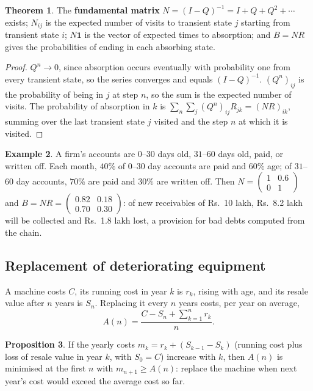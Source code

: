 \documentclass[11pt,a4paper]{article}
\numberwithin{equation}{section}
\theoremstyle{definition}
\newtheorem{thm}{Theorem}[subsection]
\newtheorem{exa}[thm]{Example}
\newtheorem{prop}[thm]{Proposition}
\begin{document}
\begin{thm}
\label{thm:absorbing}
The \textbf{fundamental matrix} $N = (I - Q)^{-1} = I + Q + Q^2 + \cdots$ exists; $N_{ij}$ is the expected number of visits to transient state $j$ starting from transient state $i$; $N\mathbf 1$ is the vector of expected times to absorption; and $B = NR$ gives the probabilities of ending in each absorbing state.
\end{thm}

\begin{proof}
$Q^n \to 0$, since absorption occurs eventually with probability one from every transient state, so the series converges and equals $(I - Q)^{-1}$. $(Q^n)_{ij}$ is the probability of being in $j$ at step $n$, so the sum is the expected number of visits. The probability of absorption in $k$ is $\sum_n\sum_j(Q^n)_{ij}R_{jk} = (NR)_{ik}$, summing
over the last transient state $j$ visited and the step $n$ at which it is visited.
\end{proof}

\begin{exa}
\label{ex:accounts}
A firm's accounts are $0$--$30$ days old, $31$--$60$ days old, paid, or written off. Each month, $40\%$ of $0$--$30$ day accounts are paid and $60\%$ age; of $31$--$60$ day accounts, $70\%$ are paid and $30\%$ are written off. Then $N = \begin{pmatrix} 1 & 0.6 \\ 0 & 1 \end{pmatrix}$ and
$B = NR = \begin{pmatrix} 0.82 & 0.18 \\ 0.70 & 0.30 \end{pmatrix}$: of new receivables of Rs.~10 lakh, Rs.~8.2 lakh will be collected and Rs.~1.8 lakh lost, a provision for bad debts computed from the chain.
\end{exa}

\subsection{Replacement of deteriorating equipment}
\label{ssec:replacement}

A machine costs $C$, its running cost in year $k$ is $r_k$, rising with age, and its resale value after $n$ years is $S_n$. Replacing it every $n$ years costs, per year on average,
\[
A(n) = \frac{C - S_n + \sum_{k = 1}^nr_k}n .
\]

\begin{prop}
\label{prop:replace}
If the yearly costs $m_k = r_k + (S_{k - 1} - S_k)$ (running cost plus loss of resale value in year $k$, with $S_0 = C$) increase with $k$, then $A(n)$ is minimised at the first $n$ with $m_{n + 1} \geq A(n)$: replace the machine when next year's cost would exceed the average cost so far.
\end{prop}
\end{document}
